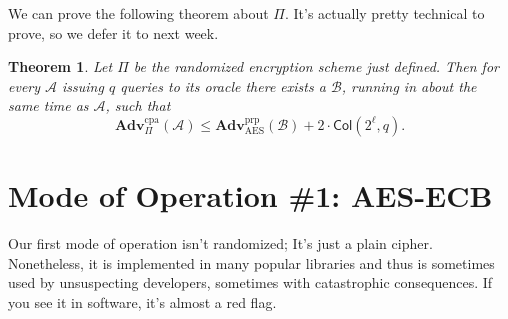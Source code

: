 \documentclass[11pt]{article}
\newtheorem{theorem}{Theorem}
\newcommand{\msgs}{\mathcal{M}}
\newcommand{\ctxts}{\mathcal{C}}
\newcommand{\keys}{\mathcal{K}}
\newcommand{\rands}{\mathcal{R}}
\newcommand{\Enc}{\mathsf{Enc}}
\newcommand{\Dec}{\mathsf{Dec}}
\newcommand{\calA}{\mathcal{A}}
\newcommand{\calB}{\mathcal{B}}
\newcommand{\Adv}{\mathbf{Adv}}
\newcommand{\AdvPRP}[2]{\Adv^{\mathrm{prp}}_{#1}({#2})}
\newcommand{\AdvCPA}[2]{\Adv^{\mathrm{cpa}}_{#1}({#2})}
\newcommand{\bits}{\{0,1\}}
\newcommand{\aes}{\mathrm{AES}}
\newcommand{\Col}{\mathsf{Col}}
\begin{document}
We can prove the following theorem about $\Pi$. It's actually pretty technical
to prove, so we defer it to next week. 
\begin{theorem}
    Let $\Pi$ be the randomized encryption scheme just defined.
    Then for every $\calA$ issuing $q$
    queries to its oracle there exists a $\calB$, running in about the same
    time as $\calA$, such that
    \[
        \AdvCPA{\Pi}{\calA} \leq \AdvPRP{\aes}{\calB} + 2\cdot \Col(2^\ell,q).
    \]
\end{theorem}


\section{Mode of Operation \#1: AES-ECB}

Our first mode of operation isn't randomized; It's just a plain cipher.
Nonetheless, it is implemented in many popular libraries and thus is sometimes
used by unsuspecting developers, sometimes with catastrophic consequences.
If you see it in software, it's almost a red flag.
\end{document}
